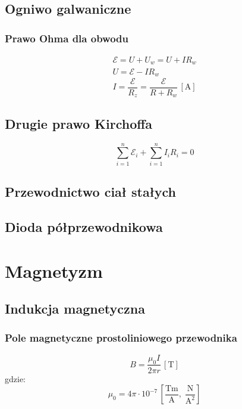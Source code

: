 \documentclass{report}
\numberwithin{equation}{chapter}
\newcommand{\unit}[1]{\,\left[\mathrm{#1}\right]}
\begin{document}
    \section{Ogniwo galwaniczne}
      \subsection{Prawo Ohma dla obwodu}
        \begin{gather}
          \mathcal E = U + U_w = U + IR_w\\
          U = \mathcal E - IR_w
        \end{gather}
        \begin{equation}
          I = \frac{\mathcal E}{R_z} = \frac{\mathcal E}{R + R_w} \unit{A}
        \end{equation}
    \section{Drugie prawo Kirchoffa}
      \begin{equation}
        \sum_{i=1}^n \mathcal E_i + \sum_{i=1}^n I_iR_i = 0
      \end{equation}
    \section{Przewodnictwo ciał stałych}
    \section{Dioda półprzewodnikowa}

  \newpage
  \chapter{Magnetyzm}
    \section{Indukcja magnetyczna}
      \subsection{Pole magnetyczne prostoliniowego przewodnika}
        \begin{equation}
          B = \frac{\mu_0 I}{2\pi r} \unit{T}
        \end{equation}
        gdzie:
        \begin{equation}
          \mu_0 = 4\pi\cdot 10^{-7} \unit{\frac{Tm}{A},\;\frac{N}{A^2}}
        \end{equation}
\end{document}
